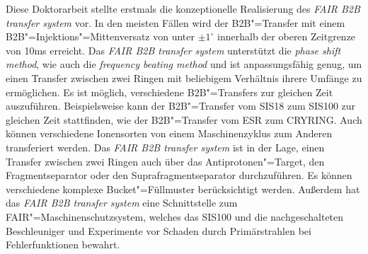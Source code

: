 Diese Doktorarbeit stellte erstmals die konzeptionelle Realisierung des \textit{FAIR B2B transfer system} vor. 
In den meisten F\"allen wird der B2B"=Transfer mit einem B2B"=Injektions"=Mittenversatz von unter $\pm 1^\circ$ innerhalb der oberen Zeitgrenze von 10ms erreicht. Das \textit{FAIR B2B transfer system} unterst\"utzt die \textit{phase shift method}, wie auch die \textit{frequency beating method} und ist anpassungsf\"ahig genug, um einen Transfer zwischen zwei Ringen mit beliebigem Verh\"altnis ihrere Umf\"ange zu erm\"oglichen. Es ist m\"oglich, verschiedene B2B"=Transfers zur gleichen Zeit auszuf\"uhren. Beispielsweise kann der B2B"=Transfer vom SIS18 zum SIS100 zur gleichen Zeit stattfinden, wie der B2B"=Transfer vom ESR zum CRYRING. Auch k\"onnen verschiedene Ionensorten von einem Maschinenzyklus zum Anderen transferiert werden. Das \textit{FAIR B2B transfer system} ist in der Lage, einen Transfer zwischen zwei Ringen auch \"uber das Antiprotonen"=Target, den Fragmentseparator oder den Suprafragmentseparator durchzuf\"uhren. Es k\"onnen verschiedene komplexe Bucket"=F\"ullmuster ber\"ucksichtigt werden. Au\ss{}erdem hat das \textit{FAIR B2B transfer system} eine Schnittstelle zum FAIR"=Maschinenschutzsystem, welches das SIS100 und die nachgeschalteten Beschleuniger und Experimente vor Schaden durch Prim\"arstrahlen bei Fehlerfunktionen bewahrt. 

